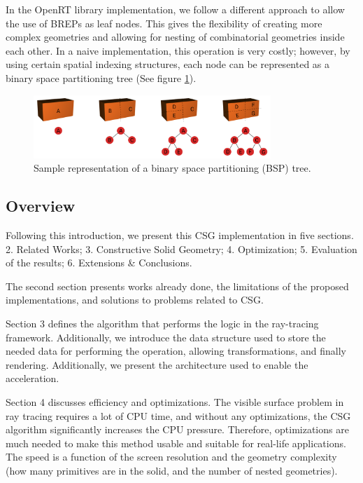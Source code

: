 \documentclass[a4paper,11pt,oneside]{article}
\begin{document}
In the OpenRT library implementation, we follow a different approach to allow the use of BREPs as leaf nodes. This gives the flexibility of creating more complex geometries and allowing for nesting of combinatorial geometries inside each other. In a naive implementation, this operation is very costly; however, by using certain spatial indexing structures, each node can be represented as a binary space partitioning tree (See figure \ref{fig4:sample_bsp_tree}).
  
\begin{figure}[ht]
	\begin{center}
		\includegraphics[width=0.8\textwidth]{intro-figures/figure4.png}
	\end{center}
	\caption{Sample representation of a binary space partitioning (BSP) tree.}
	\label{fig4:sample_bsp_tree}
\end{figure}
  
\subsection{Overview}
  
Following this introduction, we present this CSG implementation in five sections. 2. Related Works; 3. Constructive Solid Geometry; 4. Optimization; 5. Evaluation of the results; 6. Extensions \& Conclusions.
  
The second section presents works already done, the limitations of the proposed implementations, and solutions to problems related to CSG.
  
Section 3 defines the algorithm that performs the logic in the ray-tracing framework. Additionally, we introduce the data structure used to store the needed data for performing the operation, allowing transformations, and finally rendering. Additionally, we present the architecture used to enable the acceleration.
  
Section 4 discusses efficiency and optimizations. The visible surface problem in ray tracing requires a lot of CPU time, and without any optimizations, the CSG algorithm significantly increases the CPU pressure. Therefore, optimizations are much needed to make this method usable and suitable for real-life applications. The speed is a function of the screen resolution and the geometry complexity (how many primitives are in the solid, and the number of nested geometries).
  
\end{document}
